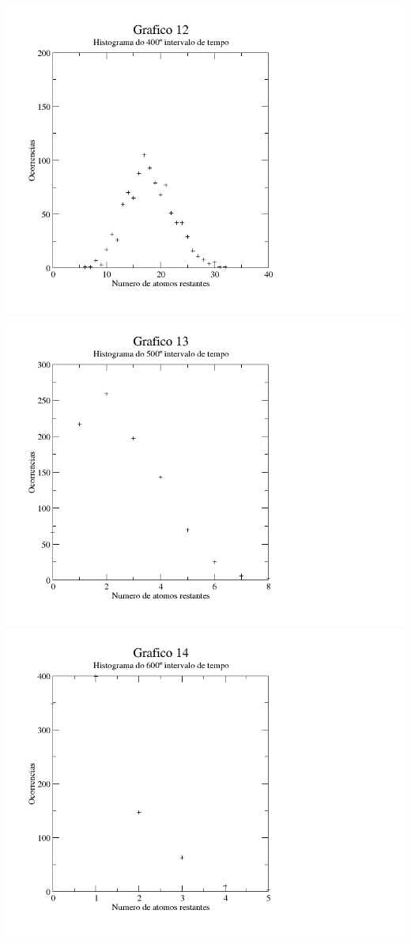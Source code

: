 \documentclass{article}
\begin{document}
\includegraphics[width=\textwidth]{graf12}
\includegraphics[width=\textwidth]{graf13}
\includegraphics[width=\textwidth]{graf14}
\end{document}
